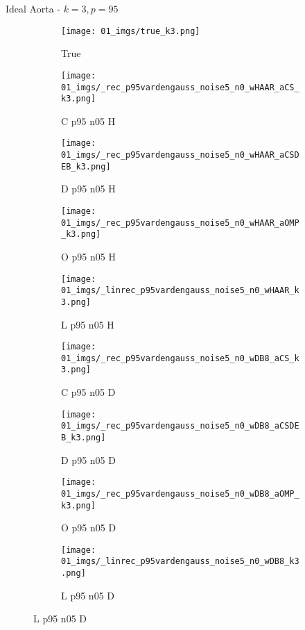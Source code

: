 \begin{frame}{Ideal Aorta - $k=3,p=95$}{}
\begin{figure}
\begin{subfigure}{0.1\textwidth}
\texttt{[image: 01\_imgs/true\_k3.png]}
\caption*{\Tiny True}
\end{subfigure}
\begin{subfigure}{0.1\textwidth}
\texttt{[image: 01\_imgs/\_rec\_p95vardengauss\_noise5\_n0\_wHAAR\_aCS\_k3.png]}
\caption*{\Tiny C p95 n05 H}
\end{subfigure}
\begin{subfigure}{0.1\textwidth}
\texttt{[image: 01\_imgs/\_rec\_p95vardengauss\_noise5\_n0\_wHAAR\_aCSDEB\_k3.png]}
\caption*{\Tiny D p95 n05 H}
\end{subfigure}
\begin{subfigure}{0.1\textwidth}
\texttt{[image: 01\_imgs/\_rec\_p95vardengauss\_noise5\_n0\_wHAAR\_aOMP\_k3.png]}
\caption*{\Tiny O p95 n05 H}
\end{subfigure}
\begin{subfigure}{0.1\textwidth}
\texttt{[image: 01\_imgs/\_linrec\_p95vardengauss\_noise5\_n0\_wHAAR\_k3.png]}
\caption*{\Tiny L p95 n05 H}
\end{subfigure}
\begin{subfigure}{0.1\textwidth}
\texttt{[image: 01\_imgs/\_rec\_p95vardengauss\_noise5\_n0\_wDB8\_aCS\_k3.png]}
\caption*{\Tiny C p95 n05 D}
\end{subfigure}
\begin{subfigure}{0.1\textwidth}
\texttt{[image: 01\_imgs/\_rec\_p95vardengauss\_noise5\_n0\_wDB8\_aCSDEB\_k3.png]}
\caption*{\Tiny D p95 n05 D}
\end{subfigure}
\begin{subfigure}{0.1\textwidth}
\texttt{[image: 01\_imgs/\_rec\_p95vardengauss\_noise5\_n0\_wDB8\_aOMP\_k3.png]}
\caption*{\Tiny O p95 n05 D}
\end{subfigure}
\begin{subfigure}{0.1\textwidth}
\texttt{[image: 01\_imgs/\_linrec\_p95vardengauss\_noise5\_n0\_wDB8\_k3.png]}
\caption*{\Tiny L p95 n05 D}
\end{subfigure}

\vspace{5pt}


\end{figure}
\end{frame}
